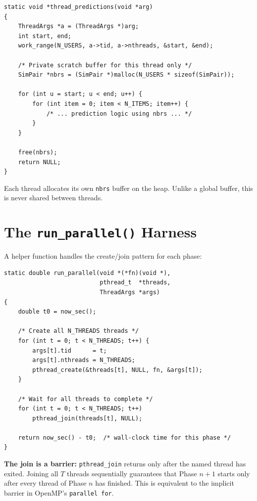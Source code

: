 \documentclass[12pt,a4paper]{article}
\begin{document}
\begin{lstlisting}
static void *thread_predictions(void *arg)
{
    ThreadArgs *a = (ThreadArgs *)arg;
    int start, end;
    work_range(N_USERS, a->tid, a->nthreads, &start, &end);

    /* Private scratch buffer for this thread only */
    SimPair *nbrs = (SimPair *)malloc(N_USERS * sizeof(SimPair));

    for (int u = start; u < end; u++) {
        for (int item = 0; item < N_ITEMS; item++) {
            /* ... prediction logic using nbrs ... */
        }
    }

    free(nbrs);
    return NULL;
}
\end{lstlisting}

Each thread allocates its own \texttt{nbrs} buffer on the heap.  Unlike a
global buffer, this is never shared between threads.

\section{The \texttt{run\_parallel()} Harness}

A helper function handles the create/join pattern for each phase:

\begin{lstlisting}
static double run_parallel(void *(*fn)(void *),
                           pthread_t  *threads,
                           ThreadArgs *args)
{
    double t0 = now_sec();

    /* Create all N_THREADS threads */
    for (int t = 0; t < N_THREADS; t++) {
        args[t].tid      = t;
        args[t].nthreads = N_THREADS;
        pthread_create(&threads[t], NULL, fn, &args[t]);
    }

    /* Wait for all threads to complete */
    for (int t = 0; t < N_THREADS; t++)
        pthread_join(threads[t], NULL);

    return now_sec() - t0;  /* wall-clock time for this phase */
}
\end{lstlisting}

\textbf{The join is a barrier:}  \texttt{pthread\_join} returns only after
the named thread has exited.  Joining all $T$ threads sequentially guarantees
that Phase $n+1$ starts only after every thread of Phase $n$ has finished.
This is equivalent to the implicit barrier in OpenMP's \texttt{parallel for}.
\end{document}
